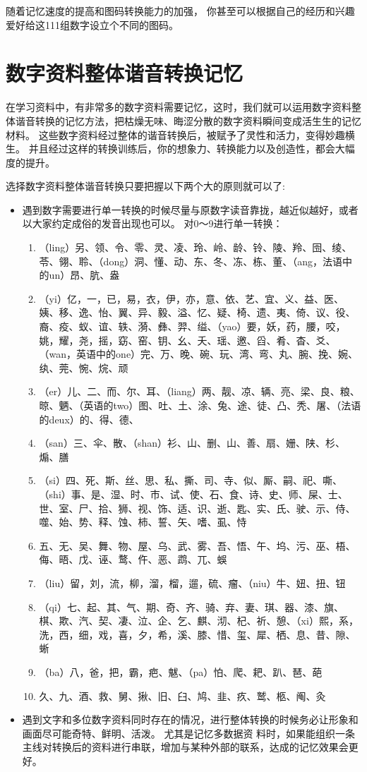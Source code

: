 随着记忆速度的提高和图码转换能力的加强， 你甚至可以根据自己的经历和兴趣爱好给这111组数字设立个不同的图码。


\section{数字资料整体谐音转换记忆}

在学习资料中，有非常多的数字资料需要记忆，这时，我们就可以运用数字资料整体谐音转换的记忆方法，把枯燥无味、晦涩分散的数字资料瞬间变成活生生的记忆材料。
这些数字资料经过整体的谐音转换后，被赋予了灵性和活力，变得妙趣横生。
并且经过这样的转换训练后，你的想象力、转换能力以及创造性，都会大幅度的提升。


选择数字资料整体谐音转换只要把握以下两个大的原则就可以了:
\begin{itemize}
\item 遇到数字需要进行单一转换的时候尽量与原数字读音靠拢，越近似越好，或者以大家约定成俗的发音出现也可以。
  对0～9进行单一转换：
  \begin{enumerate}[start=0]
  \item （ling）另、领、令、零、灵、凌、玲、岭、龄、铃、陵、羚、囹、绫、苓、翎、聆、（dong）洞、懂、动、东、冬、冻、栋、董、（ang，法语中的un）昂、肮、盎
  \item （yi）亿，一，已，易，衣，伊，亦，意、依、艺、宜、义、益、医、姨、移、逸、怡、翼、异、毅、溢、忆、疑、椅、遗、夷、倚、议、役、裔、疫、蚁、谊、轶、漪、彝、羿、缢、（yao）要，妖，药，腰，咬，姚，耀，尧，摇，窈、窑、钥、幺、夭、瑶、邀、舀、肴、杳、爻、（wan，英语中的one）完、万、晚、碗、玩、湾、弯、丸、腕、挽、婉、纨、莞、惋、烷、顽
  \item （er）儿、二、而、尔、耳、（liang）两、靓、凉、辆、亮、梁、良、粮、晾、魉、（英语的two）图、吐、土、涂、兔、途、徒、凸、秃、屠、（法语的deux）的、得、德、
  \item （san）三、伞、散、（shan）衫、山、删、山、善、扇、姗、陕、杉、煽、膳
  \item （si）四、死、斯、丝、思、私、撕、司、寺、似、厮、嗣、祀、嘶、（shi）事、是、湿、时、市、试、使、石、食、诗、史、师、屎、士、世、室、尸、拾、狮、视、饰、适、识、逝、匙、实、氏、驶、示、侍、噬、始、势、释、蚀、柿、誓、矢、嗜、虱、恃
  \item 五、无、吴、舞、物、屋、乌、武、雾、吾、悟、午、坞、污、巫、梧、侮、晤、戊、诬、鹜、仵、恶、鹉、兀、蜈
  \item （liu）留，刘，流，柳，溜，榴，遛，硫、瘤、（niu）牛、妞、扭、钮
  \item （qi）七、起、其、气、期、奇、齐、骑、弃、妻、琪、器、漆、旗、棋、欺、汽、契、凄、泣、企、乞、麒、沏、杞、祈、憩、（xi）熙，系，洗，西，细，戏，喜，夕，希，溪、膝、惜、玺、犀、栖、息、昔、隙、蜥
  \item （ba）八，爸，把，霸，疤、魃、（pa）怕、爬、耙、趴、琶、葩
  \item 久、九、酒、救、舅、揪、旧、臼、鸠、韭、疚、鹫、柩、阄、灸
  \end{enumerate}
\item 遇到文字和多位数字资料同时存在的情况，进行整体转换的时候务必让形象和画面尽可能奇特、鲜明、活泼。
  尤其是记忆多数据资 料时，如果能组织一条主线对转换后的资料进行串联，增加与某种外部的联系，达成的记忆效果会更好。
\end{itemize}


